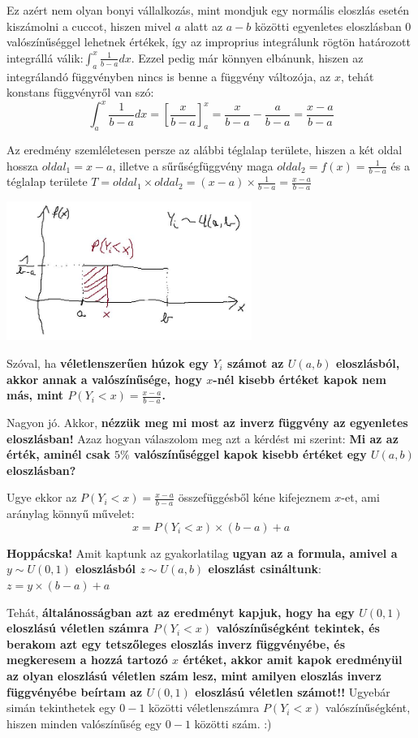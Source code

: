 \documentclass[
]{book}
\begin{document}
Ez azért nem olyan bonyi vállalkozás, mint mondjuk egy normális eloszlás esetén kiszámolni a cuccot, hiszen mivel \(a\) alatt az \(a-b\) közötti egyenletes eloszlásban \(0\) valószínűséggel lehetnek értékek, így az improprius integrálunk rögtön határozott integrállá válik:\(\int_a^x{\frac{1}{b-a}}dx\). Ezzel pedig már könnyen elbánunk, hiszen az integrálandó függvényben nincs is benne a függvény változója, az \(x\), tehát konstans függvényről van szó: \[\int_a^x{\frac{1}{b-a}}dx=\left[\frac{x}{b-a}\right]_a^x=\frac{x}{b-a}-\frac{a}{b-a}=\frac{x-a}{b-a}\]

Az eredmény szemléletesen persze az alábbi téglalap területe, hiszen a két oldal hossza \(oldal_1=x-a\), illetve a sűrűségfüggvény maga \(oldal_2=f(x)=\frac{1}{b-a}\) és a téglalap területe \(T=oldal_1 \times oldal_2 = (x-a) \times\frac{1}{b-a} = \frac{x-a}{b-a}\)

\includegraphics[width=0.6\textwidth,height=\textheight]{unifelo.jpg}

Szóval, ha \textbf{véletlenszerűen húzok egy \(Y_i\) számot az \(U(a,b)\) eloszlásból, akkor annak a valószínűsége, hogy \(x\)-nél kisebb értéket kapok nem más, mint \(P(Y_i < x) = \frac{x-a}{b-a}\).}

Nagyon jó. Akkor, \textbf{nézzük meg mi most az inverz függvény az egyenletes eloszlásban!} Azaz hogyan válaszolom meg azt a kérdést mi szerint: \textbf{Mi az az érték, aminél csak \(5\%\) valószínűséggel kapok kisebb értéket egy \(U(a,b)\) eloszlásban?}

Ugye ekkor az \(P(Y_i < x) = \frac{x-a}{b-a}\) összefüggésből kéne kifejeznem \(x\)-et, ami aránylag könnyű művelet: \[x=P(Y_i < x) \times (b-a) + a\]

\textbf{Hoppácska!} Amit kaptunk az gyakorlatilag \textbf{ugyan az a formula, amivel a \(y \sim U(0,1)\) eloszlásból \(z \sim U(a,b)\) eloszlást csináltunk}: \(z = y \times (b-a) + a\)

Tehát, \textbf{általánosságban azt az eredményt kapjuk, hogy ha egy \(U(0,1)\) eloszlású véletlen számra \(P(Y_i < x)\) valószínűségként tekintek, és berakom azt egy tetszőleges eloszlás inverz függvényébe, és megkeresem a hozzá tartozó \(x\) értéket, akkor amit kapok eredményül az olyan eloszlású véletlen szám lesz, mint amilyen eloszlás inverz függvényébe beírtam az \(U(0,1)\) eloszlású véletlen számot!!}
Ugyebár simán tekinthetek egy \(0-1\) közötti véletlenszámra \(P(Y_i < x)\) valószínűségként, hiszen minden valószínűség egy \(0-1\) közötti szám. :)
\end{document}
